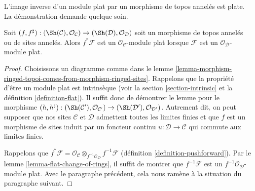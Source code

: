 \noindent
L'image inverse d'un module plat par un morphisme de topos annelés est plate.
La démonstration demande quelque soin.

\begin{lemma}
\label{lemma-pullback-flat}
\begin{reference}
\cite[Expos\'e V, Corollary 1.7.1]{SGA4}
\end{reference}
Soit
$(f, f^\sharp) :
(\Sh(\mathcal{C}), \mathcal{O}_\mathcal{C})
\to
(\Sh(\mathcal{D}), \mathcal{O}_\mathcal{D})$
soit un morphisme de topos annelés ou de sites annelés.
Alors $f^*\mathcal{F}$ est un $\mathcal{O}_\mathcal{C}$-module plat lorsque
$\mathcal{F}$ est un $\mathcal{O}_\mathcal{D}$-module plat.
\end{lemma}

\begin{proof}
Choisissons un diagramme comme dans le
lemme \ref{lemma-morphism-ringed-topoi-comes-from-morphism-ringed-sites}.
Rappelons que la propriété d'être un module plat est intrinsèque
(voir la section \ref{section-intrinsic} et la
définition \ref{definition-flat}). Il suffit donc de démontrer le lemme pour
le morphisme $(h, h^\sharp) :
(\Sh(\mathcal{C}'), \mathcal{O}_{\mathcal{C}'})
\to
(\Sh(\mathcal{D}'), \mathcal{O}_{\mathcal{D}'})$.
Autrement dit, on peut supposer que nos sites $\mathcal{C}$ et $\mathcal{D}$
admettent toutes les limites finies et que $f$ est un morphisme de sites induit
par un foncteur continu $u : \mathcal{D} \to \mathcal{C}$ qui commute aux
limites finies.

\medskip\noindent
Rappelons que $f^*\mathcal{F} =
\mathcal{O}_\mathcal{C} \otimes_{f^{-1}\mathcal{O}_\mathcal{D}}
f^{-1}\mathcal{F}$ (définition \ref{definition-pushforward}).
Par le lemme \ref{lemma-flat-change-of-rings}, il suffit de montrer que
$f^{-1}\mathcal{F}$ est un $f^{-1}\mathcal{O}_\mathcal{D}$-module plat.
Avec le paragraphe précédent, cela nous ramène à la situation du paragraphe suivant.


\end{proof}

